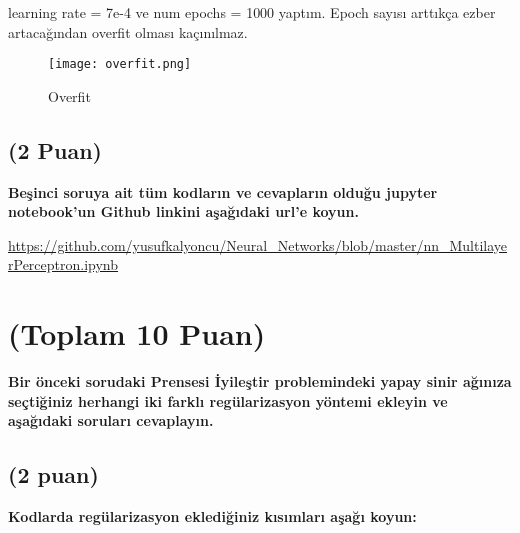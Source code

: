 \documentclass[11pt]{article}
\begin{document}
learning rate = 7e-4 ve num epochs = 1000 yaptım. Epoch sayısı arttıkça ezber artacağından overfit olması kaçınılmaz.

\begin{figure}[H]
    \centering
    \texttt{[image: overfit.png]}
    \caption{Overfit}
    \label{fig:my_pic}
\end{figure}

\subsection{(2 Puan)} \textbf{Beşinci soruya ait tüm kodların ve cevapların olduğu jupyter notebook'un Github linkini aşağıdaki url'e koyun.}

\url{https://github.com/yusufkalyoncu/Neural_Networks/blob/master/nn_MultilayerPerceptron.ipynb}

\section{(Toplam 10 Puan)} \textbf{Bir önceki sorudaki Prensesi İyileştir problemindeki yapay sinir ağınıza seçtiğiniz herhangi iki farklı regülarizasyon yöntemi ekleyin ve aşağıdaki soruları cevaplayın.} 

\subsection{(2 puan)} \textbf{Kodlarda regülarizasyon eklediğiniz kısımları aşağı koyun:} 
\end{document}
